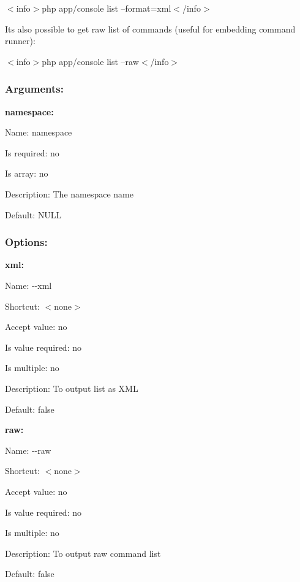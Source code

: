 $<$info$>$php app/console list --format=xml$<$/info$>$

It\textquotesingle{}s also possible to get raw list of commands (useful for embedding command runner)\+:

$<$info$>$php app/console list --raw$<$/info$>$

\subsubsection*{Arguments\+:}

{\bfseries namespace\+:}


\begin{DoxyItemize}
\item Name\+: namespace
\item Is required\+: no
\item Is array\+: no
\item Description\+: The namespace name
\item Default\+: {\ttfamily N\+U\+L\+L}
\end{DoxyItemize}

\subsubsection*{Options\+:}

{\bfseries xml\+:}


\begin{DoxyItemize}
\item Name\+: {\ttfamily -\/-\/xml}
\item Shortcut\+: $<$none$>$
\item Accept value\+: no
\item Is value required\+: no
\item Is multiple\+: no
\item Description\+: To output list as X\+M\+L
\item Default\+: {\ttfamily false}
\end{DoxyItemize}

{\bfseries raw\+:}


\begin{DoxyItemize}
\item Name\+: {\ttfamily -\/-\/raw}
\item Shortcut\+: $<$none$>$
\item Accept value\+: no
\item Is value required\+: no
\item Is multiple\+: no
\item Description\+: To output raw command list
\item Default\+: {\ttfamily false}
\end{DoxyItemize}

